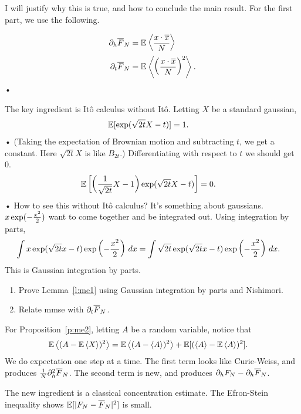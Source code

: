 I will justify why this is true, and how to conclude the main result.
For the first part, we use the following.
\begin{lem}\label{l:me1}
\begin{align*}
\partial_h \overline{F}_N &= \mathbb{E}\left\langle {\frac{x\cdot \overline{x}}{N}}\right\rangle\\
\partial_t \overline{F}_N &= \mathbb{E}\left\langle {\left( {\frac{x\cdot\overline{x}}{N}} \right)^2}\right\rangle.
\end{align*}•
\end{lem}

The key ingredient is It\^o calculus without It\^o. 
Letting $X$ be a standard gaussian, 
\begin{align*}
\mathbb{E}[\exp(\sqrt{2t}X-t)]&=1.
\end{align*}•
(Taking the expectation of Brownian motion and subtracting $t$, we get a constant. Here $\sqrt{2t}X$ is like $B_{2t}$.)
Differentiating with respect to $t$ we should get 0.
\begin{align*}
\mathbb{E}\left[ {
\left( {
\frac{1}{\sqrt{2t}}X-1
} \right)\exp(\sqrt{2t}X-t)
} \right]&=0.
\end{align*}•
How to see this without It\^o calculus? It's something about gaussians. $x\exp(-\frac{x^2}{2})$ want to come together and be integrated out. %
Using integration by parts,
\begin{align*}
\int x \exp(\sqrt{2t}x-t) \exp\left( {-\frac{x^2}{2}} \right)\,dx
&= \int \sqrt{2t}\exp(\sqrt{2t}x-t) \exp\left( {-\frac{x^2}{2}} \right)\,dx.
\end{align*}
This is Gaussian integration by parts.
\begin{exr}
\begin{enumerate}
\item
Prove Lemma~\ref{l:me1} using Gaussian integration by parts and Nishimori.
\item
Relate mmse with $\partial_t \overline{F}_N$.
\end{enumerate}
\end{exr}
For Proposition~\ref{p:me2}, letting $A$ be a random variable, notice that 
\begin{align*}
\mathbb{E}\left\langle {(A-\mathbb{E}\left\langle {X}\right\rangle)^2}\right\rangle
&= \mathbb{E}\left\langle {(A-\left\langle {A}\right\rangle)^2}\right\rangle 
+ \mathbb{E}[(\left\langle {A}\right\rangle-\mathbb{E}\left\langle {A}\right\rangle)^2].
\end{align*}
We do expectation one step at a time.
The first term looks like Curie-Weiss, and produces $\frac{1}{N} \partial_h^2 \overline{F}_N$. The second term is new, and produces $\partial_h F_N - \partial_h\overline{F}_N$.

The new ingredient is a classical concentration estimate. The Efron-Stein %
inequality shows $\mathbb{E}[|F_N-\overline{F}_N|^2]$ is small.

